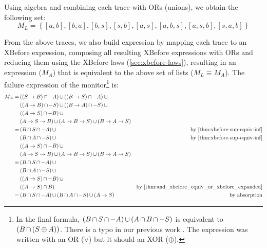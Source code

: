 \documentclass[12pt,openright,twoside,a4paper,oldfontcommands,english,brazil,final]{abntex2}
\theoremstyle{theo}
\def\xbeforeop{\ensuremath\rightarrow}
\newcommand{\xbefore}[2]{\ensuremath #1 \xbeforeop #2 }
\newcommand{\parsin}[1]{\ensuremath\left( #1 \right)}
\def\union{\ensuremath\operatorname{\cup}}
\def\inter{\ensuremath\operatorname{\cap}}
\begin{document}
Using \ac{algebra} and combining each trace with \acp{OR} (unions), we obtain the following set:
%
\[
M_L =
  \left\{
    [a,b],[b,a],[b,s],[s,b],[a,s],
    [a,b,s],[a,s,b],[s,a,b]
  \right\}
\]

From the above traces, we also build  expression by mapping each trace to an \ac{XBefore} expression, composing all resulting \ac{XBefore} expressions with ORs and reducing them using the \ac{XBefore} laws (\cref{sec:xbefore-laws}), resulting in an expression ($M_A$) that is equivalent to the above set of lists ($M_L \equiv M_A$).
The failure expression of the monitor\footnote{In the final formula, $\parsin{B \inter S \inter -A} \union \parsin{A \inter B \inter -S}$ is equivalent to $\parsin{B \inter \parsin{S \oplus A}}$. There is a typo in our previous work \cite{DM2015}. The expression was written with an OR ($\lor$) but it should an XOR ($\oplus$).} is:
%
\begin{align*}
M_A = & \parsin{\parsin{\xbefore{S}{B}} \inter -A} \union \parsin{\parsin{\xbefore{B}{S}} \inter -A} \union\\
  &\parsin{\parsin{\xbefore{A}{B}} \inter -S} \union \parsin{\parsin{\xbefore{B}{A}} \inter -S} \union\\
  & \parsin{\parsin{\xbefore{A}{S}} \inter -B} \union \\
  & \parsin{\xbefore{\xbefore{A}{S}}{B}} \union \parsin{\xbefore{\xbefore{A}{B}}{S}} \union \parsin{\xbefore{\xbefore{B}{A}}{S}} \\
= &\parsin{B \inter S \inter -A} \union & \text{by \eqref{thm:xbefore-sup-equiv-inf}}\\
  & \parsin{B \inter A \inter -S} \union & \text{by \eqref{thm:xbefore-sup-equiv-inf}}\\
  & \parsin{\parsin{\xbefore{A}{S}} \inter -B} \union\\
  & \parsin{\xbefore{\xbefore{A}{S}}{B}} \union \parsin{\xbefore{\xbefore{A}{B}}{S}} \union \parsin{\xbefore{\xbefore{B}{A}}{S}}\\
%
= &\parsin{B \inter S \inter -A} \union \\
  & \parsin{B \inter A \inter -S} \union \\
  & \parsin{\parsin{\xbefore{A}{S}} \inter -B} \union \\
  & \parsin{\parsin{\xbefore{A}{S}} \inter B} & \text{by \eqref{thm:and_xbefore_equiv_or_xbefore_expanded}}\\
%
= &\parsin{B \inter S \inter -A} \union \parsin{B \inter A \inter -S} \union \parsin{\xbefore{A}{S}} & \text{by absorption}
\end{align*}
\end{document}

